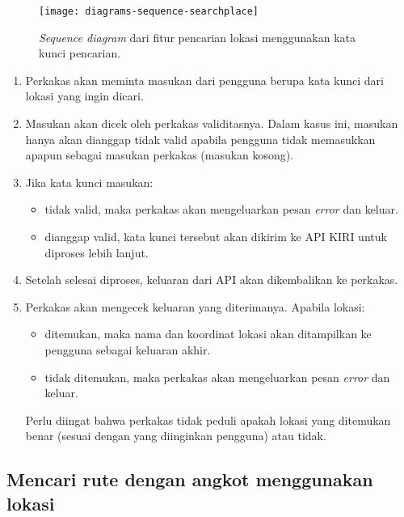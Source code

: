 \begin{figure}[h]
    \centering
    \texttt{[image: diagrams-sequence-searchplace]}
    \caption[\textit{Sequence diagram} fitur pencarian lokasi menggunakan kata kunci lokasi]{\textit{Sequence diagram} dari fitur pencarian lokasi menggunakan kata kunci pencarian.}
    \label{fig:diagrams-sequence-searchplace}
\end{figure}

\begin{enumerate}
	\item Perkakas akan meminta masukan dari pengguna berupa kata kunci dari lokasi yang ingin dicari.
	\item Masukan akan dicek oleh perkakas validitasnya. Dalam kasus ini, masukan hanya akan dianggap tidak valid apabila pengguna tidak memasukkan apapun sebagai masukan perkakas (masukan kosong).
	\item Jika kata kunci masukan:

	\begin{itemize}
		\item tidak valid, maka perkakas akan mengeluarkan pesan \textit{error} dan keluar.
		\item dianggap valid, kata kunci tersebut akan dikirim ke API KIRI untuk diproses lebih lanjut.
	\end{itemize}
	
	\item Setelah selesai diproses, keluaran dari API akan dikembalikan ke perkakas.
	\item Perkakas akan mengecek keluaran yang diterimanya. Apabila lokasi:
	
	\begin{itemize}
		\item ditemukan, maka nama dan koordinat \latlon lokasi akan ditampilkan ke pengguna sebagai keluaran akhir.
		\item tidak ditemukan, maka perkakas akan mengeluarkan pesan \textit{error} dan keluar.
	\end{itemize}
	
	Perlu diingat bahwa perkakas tidak peduli apakah lokasi yang ditemukan benar (sesuai dengan yang diinginkan pengguna) atau tidak.
	
\end{enumerate}

\subsection{Mencari rute dengan angkot menggunakan \latlon lokasi}
\label{sec:design-flow-findroute}

